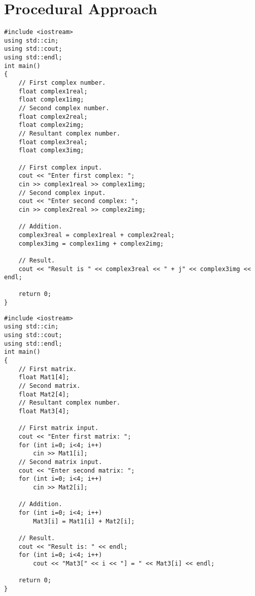 \documentclass[12pt,a4paper]{article}
\begin{document}
\section{Procedural Approach}
\begin{lstlisting}[caption={Simple prodecural approach to complex number addition}]
#include <iostream>
using std::cin;
using std::cout;
using std::endl;
int main()
{
	// First complex number.
	float complex1real;
	float complex1img;
	// Second complex number.
	float complex2real;
	float complex2img;
	// Resultant complex number.
	float complex3real;
	float complex3img;
	
	// First complex input.
	cout << "Enter first complex: ";
	cin >> complex1real >> complex1img;
	// Second complex input.
	cout << "Enter second complex: ";
	cin >> complex2real >> complex2img;
	
	// Addition.
	complex3real = complex1real + complex2real;
	complex3img = complex1img + complex2img;
	
	// Result.
	cout << "Result is " << complex3real << " + j" << complex3img << endl;
	
	return 0;
}
\end{lstlisting}
\begin{lstlisting}[caption={Simple prodecural approach to matrix addition}]
#include <iostream>
using std::cin;
using std::cout;
using std::endl;
int main()
{
	// First matrix.
	float Mat1[4];
	// Second matrix.
	float Mat2[4];
	// Resultant complex number.
	float Mat3[4];
	
	// First matrix input.
	cout << "Enter first matrix: ";
	for (int i=0; i<4; i++)
		cin >> Mat1[i];
	// Second matrix input.
	cout << "Enter second matrix: ";
	for (int i=0; i<4; i++)
		cin >> Mat2[i];
	
	// Addition.
	for (int i=0; i<4; i++)
		Mat3[i] = Mat1[i] + Mat2[i];
	
	// Result.
	cout << "Result is: " << endl;
	for (int i=0; i<4; i++)
		cout << "Mat3[" << i << "] = " << Mat3[i] << endl;
	
	return 0;
}
\end{lstlisting}
\end{document}
